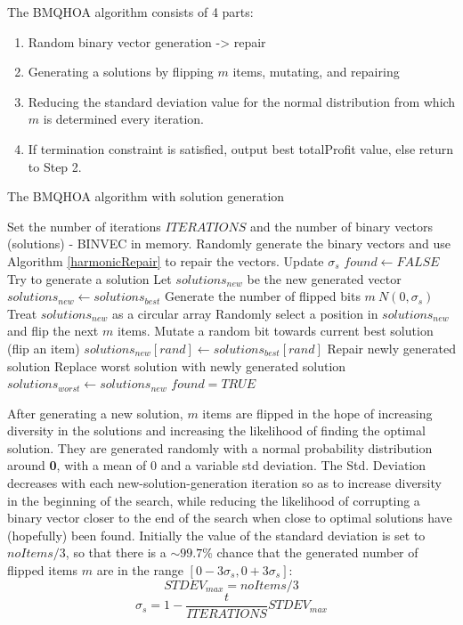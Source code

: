 \documentclass[titlepage]{article}
\begin{document}
The BMQHOA algorithm consists of 4 parts:
\begin{enumerate}
    \item Random binary vector generation -> repair
    \item Generating a solutions by flipping $m$ items, mutating, and repairing
    \item Reducing the standard deviation value for the normal distribution from which $m$ is determined every iteration.
    \item If termination constraint is satisfied, output best totalProfit value, else return to Step 2.
\end{enumerate}

\begin{breakablealgorithm}
\caption{The BMQHOA algorithm with solution generation}\label{BMQHOA}
    \begin{algorithmic}[1]
        \State Set the number of iterations $ITERATIONS$ and the number of binary vectors (solutions) - BINVEC in memory.
        \State Randomly generate the binary vectors and use Algorithm \ref{harmonicRepair} to repair the vectors. 
            \State Update $\sigma_{s}$
            \State $found \gets FALSE$
                \State Try to generate a solution
                \State Let $solutions_{new}$ be the new generated vector 
                \State $solutions_{new} \gets solutions_{best}$
                \State Generate the number of flipped bits $m ~ N(0, \sigma_{s})$
                \State Treat $solutions_{new}$ as a circular array
                \State Randomly select a position in $solutions_{new}$ and flip the next $m$ items.
                \State Mutate a random bit towards current best solution (flip an item)
                \State $solutions_{new}[rand] \gets solutions_{best}[rand]$
                \State Repair newly generated solution
                    \State Replace worst solution with newly generated solution
                    \State $solutions_{worst} \gets solutions_{new}$
                    \State $found = TRUE$
                \EndIf
            \EndWhile
        \EndWhile
    \end{algorithmic}
\end{breakablealgorithm}
\vskip 0.5cm

After generating a new solution, $m$ items are flipped in the hope of increasing diversity in the solutions and increasing the likelihood of finding the optimal solution. They are generated randomly with a normal probability distribution around \textbf{0}, with a mean of $0$ and a variable std deviation. The Std. Deviation decreases with each new-solution-generation iteration so as to increase diversity in the beginning of the search, while reducing the likelihood of corrupting a binary vector closer to the end of the search when close to optimal solutions have (hopefully) been found. Initially the value of the standard deviation is set to $noItems/3$, so that there is a $\sim 99.7\%$ chance that the generated number of flipped items $m$ are in the range $[0-3\sigma_{s}, 0+3\sigma_{s}]$:
$$STDEV_{max} = noItems/3$$
$$\sigma_{s} = 1-\frac{t}{ITERATIONS} STDEV_{max}$$
\end{document}

